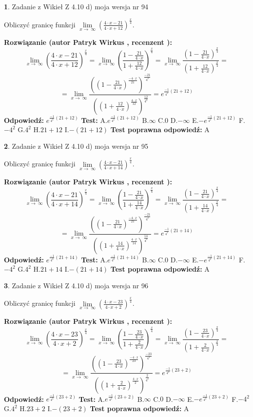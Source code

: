 \documentclass[12pt, a4paper]{article}
\theoremstyle{definition} %
\newtheorem{zad}{}
\newcommand{\zadStart}[1]{\begin{zad}#1\newline}
\newcommand{\zadStop}{\end{zad}}
\newcommand{\rozwStart}[2]{\noindent \textbf{Rozwiązanie (autor #1 , recenzent #2): }\newline}
\newcommand{\rozwStop}{\newline}
\newcommand{\odpStart}{\noindent \textbf{Odpowiedź:}\newline}
\newcommand{\odpStop}{\newline}
\newcommand{\testStart}{\noindent \textbf{Test:}\newline}
\newcommand{\testStop}{\newline}
\newcommand{\kluczStart}{\noindent \textbf{Test poprawna odpowiedź:}\newline}
\newcommand{\kluczStop}{\newline}
\begin{document}
\zadStart{Zadanie z Wikieł Z 4.10 d) moja wersja nr 94}


Obliczyć granicę funkcji  $\lim\limits_{x\to\ \infty}(\frac{4\cdot x-21}{4\cdot x+12})^{\frac{x}{4}}$.
\zadStop
\rozwStart{Patryk Wirkus}{}
$$\lim\limits_{x\to\ \infty}(\frac{4\cdot x-21}{4\cdot x+12})^{\frac{x}{4}} = \lim\limits_{x\to\ \infty}(\frac{1-\frac{21}{4\cdot x}}{1+\frac{12}{4\cdot x}})^{\frac{x}{4}}=\lim\limits_{x\to\ \infty}\frac{(1-\frac{21}{4\cdot x})^{\frac{x}{4}}}{(1+\frac{12}{4\cdot x})^{\frac{x}{4}}}=$$
$$=\lim\limits_{x\to\ \infty}\frac{((1-\frac{21}{4\cdot x})^{\frac{-4\cdot x}{21}})^{\frac{-21}{4^{2}}}}{((1+\frac{12}{4\cdot x})^{\frac{4\cdot x}{12}})^{\frac{12}{4^{2}}}}=e^{\frac{-1}{4^{2}}(21+12)}$$
\rozwStop
\odpStart
$e^{\frac{-1}{4^{2}}(21+12)}$
\odpStop
\testStart
A.$e^{\frac{-1}{4^{2}}(21+12)}$ B.$\infty$ C.$0$ D.$-\infty$ E.$-e^{\frac{-1}{4^{2}}(21+12)}$
F.$-4^{2}$ G.$4^{2}$
H.$21+12$
I.$-(21+12)$
\testStop
\kluczStart
A
\kluczStop



\zadStart{Zadanie z Wikieł Z 4.10 d) moja wersja nr 95}


Obliczyć granicę funkcji  $\lim\limits_{x\to\ \infty}(\frac{4\cdot x-21}{4\cdot x+14})^{\frac{x}{4}}$.
\zadStop
\rozwStart{Patryk Wirkus}{}
$$\lim\limits_{x\to\ \infty}(\frac{4\cdot x-21}{4\cdot x+14})^{\frac{x}{4}} = \lim\limits_{x\to\ \infty}(\frac{1-\frac{21}{4\cdot x}}{1+\frac{14}{4\cdot x}})^{\frac{x}{4}}=\lim\limits_{x\to\ \infty}\frac{(1-\frac{21}{4\cdot x})^{\frac{x}{4}}}{(1+\frac{14}{4\cdot x})^{\frac{x}{4}}}=$$
$$=\lim\limits_{x\to\ \infty}\frac{((1-\frac{21}{4\cdot x})^{\frac{-4\cdot x}{21}})^{\frac{-21}{4^{2}}}}{((1+\frac{14}{4\cdot x})^{\frac{4\cdot x}{14}})^{\frac{14}{4^{2}}}}=e^{\frac{-1}{4^{2}}(21+14)}$$
\rozwStop
\odpStart
$e^{\frac{-1}{4^{2}}(21+14)}$
\odpStop
\testStart
A.$e^{\frac{-1}{4^{2}}(21+14)}$ B.$\infty$ C.$0$ D.$-\infty$ E.$-e^{\frac{-1}{4^{2}}(21+14)}$
F.$-4^{2}$ G.$4^{2}$
H.$21+14$
I.$-(21+14)$
\testStop
\kluczStart
A
\kluczStop



\zadStart{Zadanie z Wikieł Z 4.10 d) moja wersja nr 96}


Obliczyć granicę funkcji  $\lim\limits_{x\to\ \infty}(\frac{4\cdot x-23}{4\cdot x+2})^{\frac{x}{4}}$.
\zadStop
\rozwStart{Patryk Wirkus}{}
$$\lim\limits_{x\to\ \infty}(\frac{4\cdot x-23}{4\cdot x+2})^{\frac{x}{4}} = \lim\limits_{x\to\ \infty}(\frac{1-\frac{23}{4\cdot x}}{1+\frac{2}{4\cdot x}})^{\frac{x}{4}}=\lim\limits_{x\to\ \infty}\frac{(1-\frac{23}{4\cdot x})^{\frac{x}{4}}}{(1+\frac{2}{4\cdot x})^{\frac{x}{4}}}=$$
$$=\lim\limits_{x\to\ \infty}\frac{((1-\frac{23}{4\cdot x})^{\frac{-4\cdot x}{23}})^{\frac{-23}{4^{2}}}}{((1+\frac{2}{4\cdot x})^{\frac{4\cdot x}{2}})^{\frac{2}{4^{2}}}}=e^{\frac{-1}{4^{2}}(23+2)}$$
\rozwStop
\odpStart
$e^{\frac{-1}{4^{2}}(23+2)}$
\odpStop
\testStart
A.$e^{\frac{-1}{4^{2}}(23+2)}$ B.$\infty$ C.$0$ D.$-\infty$ E.$-e^{\frac{-1}{4^{2}}(23+2)}$
F.$-4^{2}$ G.$4^{2}$
H.$23+2$
I.$-(23+2)$
\testStop
\kluczStart
A
\kluczStop
\end{document}

